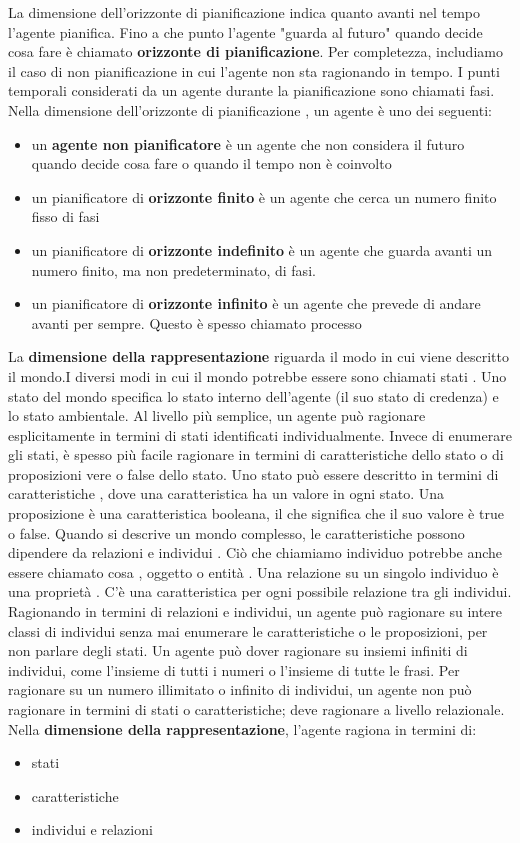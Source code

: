 \documentclass[a4paper]{extarticle}
\begin{document}
La dimensione dell'orizzonte di pianificazione indica quanto avanti nel tempo l'agente pianifica. Fino a che punto l'agente "guarda al futuro" quando decide cosa fare è chiamato \textbf{orizzonte di pianificazione}. Per completezza, includiamo il caso di non pianificazione in cui l'agente non sta ragionando in tempo. I punti temporali considerati da un agente durante la pianificazione sono chiamati fasi. Nella dimensione dell'orizzonte di pianificazione , un agente è uno dei seguenti:
\begin{itemize}
\item un \textbf{agente non pianificatore} è un agente che non considera il futuro quando decide cosa fare o quando il tempo non è coinvolto
\item un pianificatore di \textbf{orizzonte finito} è un agente che cerca un numero finito fisso di fasi
\item un pianificatore di \textbf{orizzonte indefinito} è un agente che guarda avanti un numero finito, ma non predeterminato, di fasi.
\item un pianificatore di \textbf{orizzonte infinito} è un agente che prevede di andare avanti per sempre. Questo è spesso chiamato processo
\end{itemize}

La \textbf{dimensione della rappresentazione} riguarda il modo in cui viene descritto il mondo.I diversi modi in cui il mondo potrebbe essere sono chiamati stati . Uno stato del mondo specifica lo stato interno dell'agente (il suo stato di credenza) e lo stato ambientale. Al livello più semplice, un agente può ragionare esplicitamente in termini di stati identificati individualmente. Invece di enumerare gli stati, è spesso più facile ragionare in termini di caratteristiche dello stato o di proposizioni vere o false dello stato. Uno stato può essere descritto in termini di caratteristiche , dove una caratteristica ha un valore in ogni stato. Una proposizione è una caratteristica booleana, il che significa che il suo valore è true o false. Quando si descrive un mondo complesso, le caratteristiche possono dipendere da relazioni e individui . Ciò che chiamiamo individuo potrebbe anche essere chiamato cosa , oggetto o entità . Una relazione su un singolo individuo è una proprietà . C'è una caratteristica per ogni possibile relazione tra gli individui. Ragionando in termini di relazioni e individui, un agente può ragionare su intere classi di individui senza mai enumerare le caratteristiche o le proposizioni, per non parlare degli stati. Un agente può dover ragionare su insiemi infiniti di individui, come l'insieme di tutti i numeri o l'insieme di tutte le frasi. Per ragionare su un numero illimitato o infinito di individui, un agente non può ragionare in termini di stati o caratteristiche; deve ragionare a livello relazionale. Nella \textbf{dimensione della rappresentazione}, l'agente ragiona in termini di:
\begin{itemize}
\item stati
\item caratteristiche
\item individui e relazioni
\end{itemize}
\end{document}
